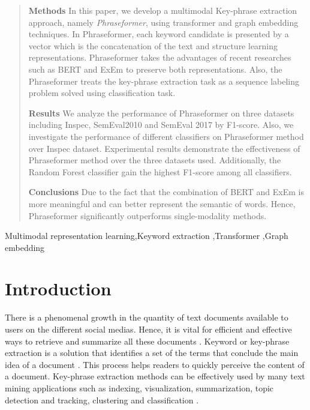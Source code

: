 \documentclass[review,3p]{elsarticle}
\begin{document}
\begin{frontmatter}
\begin{abstract}
\textbf{Methods}
In this paper, we develop a multimodal Key-phrase extraction approach, namely \textit{Phraseformer}, using transformer and graph embedding techniques. In Phraseformer, each keyword candidate is presented by a vector which is the concatenation of the text and structure learning representations. Phraseformer takes the advantages of recent researches such as BERT and ExEm to preserve both representations. Also, the Phraseformer treats the key-phrase extraction task as a sequence labeling problem solved using classification task.

\textbf{Results}
We analyze the performance of Phraseformer on three datasets including Inspec, SemEval2010 and SemEval 2017 by F1-score. Also, we investigate the performance of different classifiers on Phraseformer method over Inspec dataset. Experimental results demonstrate the effectiveness of Phraseformer method over the three datasets used. Additionally, the Random Forest classifier gain the highest F1-score among all classifiers.
 
\textbf{Conclusions}
Due to the fact that the combination of BERT and ExEm is more meaningful and can better represent the semantic of words. Hence, Phraseformer significantly outperforms single-modality methods.
 


\end{abstract}

\begin{keyword}
Multimodal representation learning\sep Keyword extraction \sep Transformer \sep Graph embedding
\end{keyword}

\end{frontmatter}



\section{Introduction}\label{sec:introduction}
There is a phenomenal growth in the quantity of text documents available to users on the different social medias. Hence, it is vital for efficient and effective ways to retrieve and summarize all these documents \cite{vega2019multi}. Keyword or key-phrase extraction is a solution that identifies a set of the terms that conclude the main idea of a document \cite{berry2010text}. This process helps readers to quickly perceive the content of a document. Key-phrase extraction methods can be effectively used by many text  mining  applications such as indexing, visualization, summarization, topic detection  and  tracking, clustering and classification \cite{lahiri2018keywords, zhang2008automatic}.
\end{document}
